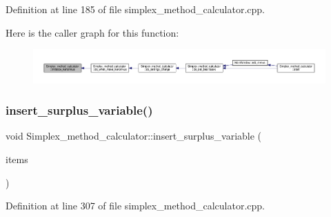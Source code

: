 Definition at line 185 of file simplex\+\_\+method\+\_\+calculator.\+cpp.

Here is the caller graph for this function\+:\nopagebreak
\begin{figure}[H]
\begin{center}
\leavevmode
\includegraphics[width=350pt]{classSimplex__method__calculator_abb2932fa0eddff8f3a3737513cad8ece_icgraph}
\end{center}
\end{figure}
\mbox{\label{classSimplex__method__calculator_a4e034d789bea086efc896fee4d15682b}} 
\subsubsection{\texorpdfstring{insert\+\_\+surplus\+\_\+variable()}{insert\_surplus\_variable()}}
{\footnotesize\ttfamily void Simplex\+\_\+method\+\_\+calculator\+::insert\+\_\+surplus\+\_\+variable (\begin{DoxyParamCaption}\item[{Q\+List$<$ Q\+Standard\+Item $\ast$$>$}]{items }\end{DoxyParamCaption})\hspace{0.3cm}{\ttfamily [private]}}



Definition at line 307 of file simplex\+\_\+method\+\_\+calculator.\+cpp.

